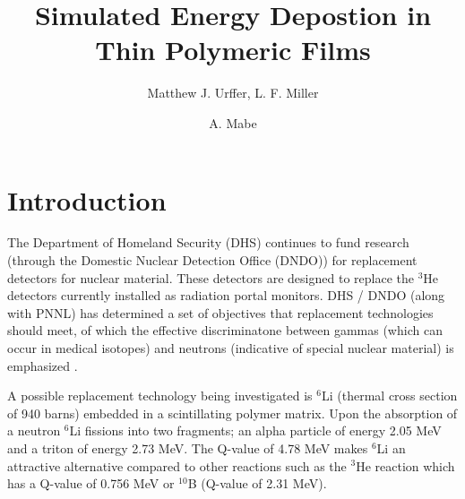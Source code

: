 \documentclass{anstrans}
\title{Simulated Energy Depostion in Thin Polymeric Films}
\author{Matthew J. Urffer, L. F. Miller \and A. Mabe}
\institute{
University of Tennessee, Knoxville, TN, 37916
}
\newcommand{\iso}[2]{${}^{#2}${#1}}
\begin{document}
\section{Introduction}
The Department of Homeland Security (DHS) continues to fund research (through the Domestic Nuclear Detection Office (DNDO)) for replacement detectors for nuclear material.
These detectors are designed to replace the \iso{He}{3} detectors currently installed as radiation portal monitors.
DHS / DNDO (along with PNNL) has determined a set of objectives that replacement technologies should meet, of which the effective discriminatone between gammas (which can occur in medical isotopes) and neutrons (indicative of special nuclear material) is emphasized \cite{kouzes_neutron_2010,kouzes_neutron_1999}. 

A possible replacement technology being investigated is \iso{Li}{6} (thermal cross section of 940 barns) embedded in a scintillating polymer matrix.
Upon the absorption of a neutron \iso{Li}{6} fissions into two fragments; an alpha particle of energy 2.05 MeV and a triton of energy 2.73 MeV.
The Q-value of 4.78 MeV makes \iso{Li}{6} an attractive alternative compared to other reactions such as the \iso{He}{3} reaction which has a Q-value of 0.756 MeV or \iso{B}{10} (Q-value of 2.31 MeV).

\end{document}
